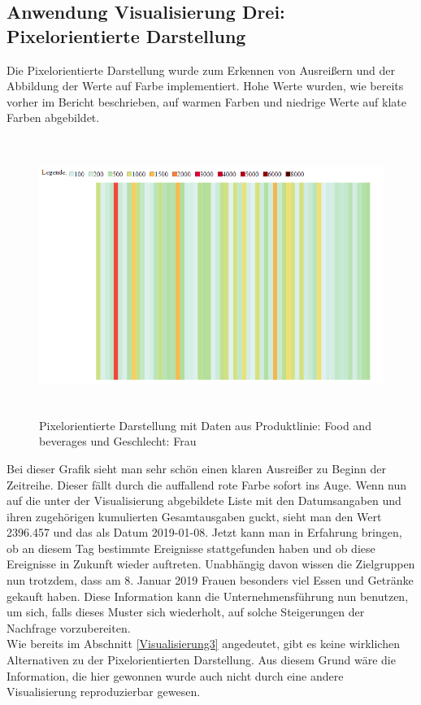 \documentclass[usegeometry=true]{scrartcl}
\begin{document}
\subsection{Anwendung Visualisierung Drei: Pixelorientierte Darstellung}
Die Pixelorientierte Darstellung wurde zum Erkennen von Ausreißern und der Abbildung der Werte auf Farbe implementiert. Hohe Werte wurden, wie bereits vorher im Bericht
beschrieben, auf warmen Farben und niedrige Werte auf klate Farben abgebildet.

\begin{figure} [H]
	\begin{center}
		\includegraphics[height=9cm]{IMG/PixelFoodFrau.png}
		\caption{Pixelorientierte Darstellung mit Daten aus Produktlinie: Food and beverages und Geschlecht: Frau}
		\label{fig:PixelFoodFrau}
	\end{center}
\end{figure}

\noindent Bei dieser Grafik sieht man sehr schön einen klaren Ausreißer zu Beginn der Zeitreihe. Dieser fällt durch die auffallend rote Farbe sofort ins Auge.
Wenn nun auf die unter der Visualisierung abgebildete Liste mit den Datumsangaben und ihren zugehörigen kumulierten Gesamtausgaben guckt, sieht man den Wert 2396.457 und
das als Datum 2019-01-08. Jetzt kann man in Erfahrung bringen, ob an diesem Tag bestimmte Ereignisse stattgefunden haben und ob diese Ereignisse in Zukunft wieder auftreten.
Unabhängig davon wissen die Zielgruppen nun trotzdem, dass am 8. Januar 2019 Frauen besonders viel Essen und Getränke gekauft haben. Diese Information kann die Unternehmensführung
nun benutzen, um sich, falls dieses Muster sich wiederholt, auf solche Steigerungen der Nachfrage vorzubereiten.\\
\noindent Wie bereits im Abschnitt \ref{Visualisierung3} angedeutet, gibt es keine wirklichen Alternativen zu der Pixelorientierten Darstellung. Aus diesem Grund wäre die
Information, die hier gewonnen wurde auch nicht durch eine andere Visualisierung reproduzierbar gewesen.
\end{document}
